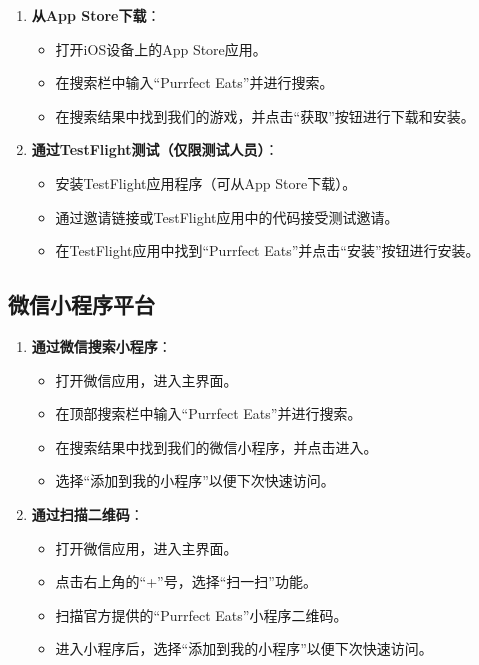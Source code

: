 \documentclass{mancls}%
\begin{document}
\begin{enumerate}
  \item \textbf{从App Store下载}：
        \begin{itemize}
          \item 打开iOS设备上的App Store应用。
          \item 在搜索栏中输入“Purrfect Eats”并进行搜索。
          \item 在搜索结果中找到我们的游戏，并点击“获取”按钮进行下载和安装。
        \end{itemize}
  \item \textbf{通过TestFlight测试（仅限测试人员）}：
        \begin{itemize}
          \item 安装TestFlight应用程序（可从App Store下载）。
          \item 通过邀请链接或TestFlight应用中的代码接受测试邀请。
          \item 在TestFlight应用中找到“Purrfect Eats”并点击“安装”按钮进行安装。
        \end{itemize}
\end{enumerate}

\subsection{微信小程序平台}

\begin{enumerate}
  \item \textbf{通过微信搜索小程序}：
        \begin{itemize}
          \item 打开微信应用，进入主界面。
          \item 在顶部搜索栏中输入“Purrfect Eats”并进行搜索。
          \item 在搜索结果中找到我们的微信小程序，并点击进入。
          \item 选择“添加到我的小程序”以便下次快速访问。
        \end{itemize}
  \item \textbf{通过扫描二维码}：
        \begin{itemize}
          \item 打开微信应用，进入主界面。
          \item 点击右上角的“+”号，选择“扫一扫”功能。
          \item 扫描官方提供的“Purrfect Eats”小程序二维码。
          \item 进入小程序后，选择“添加到我的小程序”以便下次快速访问。
        \end{itemize}
\end{enumerate}
\end{document}
